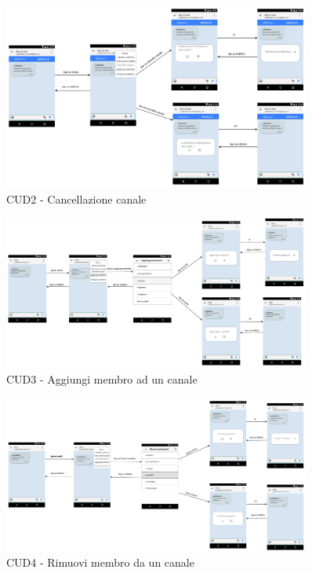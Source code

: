\begin{figure}
	\centering
	\includegraphics[width=0.9\textwidth]{imgs/gruppo6/activities/act_cud2_cancella_canale.pdf}
	\caption{CUD2 - Cancellazione canale}
	\label{fig:act-cud2}
\end{figure}

\begin{figure}
	\centering
	\includegraphics[width=0.9\textwidth]{imgs/gruppo6/activities/act_cud3_aggiungi_membro_chat.pdf}
	\caption{CUD3 - Aggiungi membro ad un canale}
	\label{fig:act-cud3}
\end{figure}

\begin{figure}
	\centering
	\includegraphics[width=0.9\textwidth]{imgs/gruppo6/activities/act_cud4_rimuovi_membro_da_canale.pdf}
	\caption{CUD4 - Rimuovi membro da un canale}
	\label{fig:act-cud4}
\end{figure}

